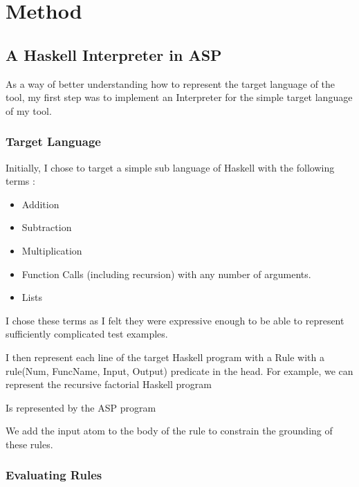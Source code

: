 \chapter{Method}

\section{A Haskell Interpreter in ASP}

As a way of better understanding how to represent the target language of the tool, my first step was to implement an Interpreter for the simple target language of my tool.

\subsection{Target Language}

Initially, I chose to target a simple sub language of Haskell with the following terms :

\begin{itemize}
\item Addition
\item Subtraction
\item Multiplication
\item Function Calls (including recursion) with any number of arguments.
\item Lists
\end{itemize}

I chose these terms as I felt they were expressive enough to be able to represent sufficiently complicated test examples.

I then represent each line of the target Haskell program with a Rule with a rule(Num, FuncName, Input, Output) predicate in the head. For example, we can represent the recursive factorial Haskell program



Is represented by the ASP program



We add the input atom to the body of the rule to constrain the grounding of these rules. \\

\subsection{Evaluating Rules}

